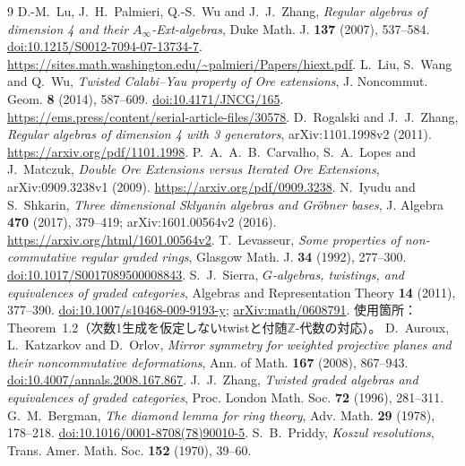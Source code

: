 \documentclass[11pt,a4paper]{ltjsarticle}
\theoremstyle{definition}
\newcommand{\ZZ}{\mathbb Z}
\begin{document}
\begingroup
\small
\begin{thebibliography}{9}
D.-M.~Lu, J.~H.~Palmieri, Q.-S.~Wu and J.~J.~Zhang,
\emph{Regular algebras of dimension 4 and their $A_\infty$-Ext-algebras},
Duke Math. J. \textbf{137} (2007), 537--584.
\href{https://doi.org/10.1215/S0012-7094-07-13734-7}{doi:10.1215/S0012-7094-07-13734-7}.
\url{https://sites.math.washington.edu/~palmieri/Papers/hiext.pdf}.
L.~Liu, S.~Wang and Q.~Wu,
\emph{Twisted Calabi--Yau property of Ore extensions},
J. Noncommut. Geom. \textbf{8} (2014), 587--609.
\href{https://doi.org/10.4171/JNCG/165}{doi:10.4171/JNCG/165}.
\url{https://ems.press/content/serial-article-files/30578}.
D.~Rogalski and J.~J.~Zhang,
\emph{Regular algebras of dimension 4 with 3 generators},
arXiv:1101.1998v2 (2011).
\url{https://arxiv.org/pdf/1101.1998}.
P.~A.~A.~B.~Carvalho, S.~A.~Lopes and J.~Matczuk,
\emph{Double Ore Extensions versus Iterated Ore Extensions},
arXiv:0909.3238v1 (2009).
\url{https://arxiv.org/pdf/0909.3238}.
N.~Iyudu and S.~Shkarin,
\emph{Three dimensional Sklyanin algebras and Gr\"obner bases},
J. Algebra \textbf{470} (2017), 379--419;
arXiv:1601.00564v2 (2016).
\url{https://arxiv.org/html/1601.00564v2}.
T.~Levasseur,
\emph{Some properties of non-commutative regular graded rings},
Glasgow Math. J. \textbf{34} (1992), 277--300.
\href{https://doi.org/10.1017/S0017089500008843}{doi:10.1017/S0017089500008843}.
S.~J.~Sierra,
\emph{$G$-algebras, twistings, and equivalences of graded categories},
Algebras and Representation Theory \textbf{14} (2011), 377--390.
\href{https://doi.org/10.1007/s10468-009-9193-y}{doi:10.1007/s10468-009-9193-y};
\href{https://arxiv.org/abs/math/0608791}{arXiv:math/0608791}.
使用箇所：Theorem~1.2（次数1生成を仮定しないtwistと付随$\ZZ$-代数の対応）。
D.~Auroux, L.~Katzarkov and D.~Orlov,
\emph{Mirror symmetry for weighted projective planes and their noncommutative deformations},
Ann. of Math. \textbf{167} (2008), 867--943.
\href{https://doi.org/10.4007/annals.2008.167.867}{doi:10.4007/annals.2008.167.867}.
J.~J.~Zhang, \emph{Twisted graded algebras and equivalences of graded categories},
Proc. London Math. Soc. \textbf{72} (1996), 281--311.
G.~M.~Bergman, \emph{The diamond lemma for ring theory},
Adv. Math. \textbf{29} (1978), 178--218.
\href{https://doi.org/10.1016/0001-8708(78)90010-5}{doi:10.1016/0001-8708(78)90010-5}.
S.~B.~Priddy, \emph{Koszul resolutions},
Trans. Amer. Math. Soc. \textbf{152} (1970), 39--60.
\end{thebibliography}
\endgroup
\end{document}
